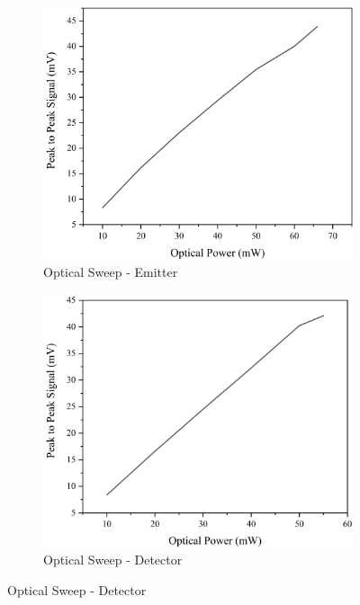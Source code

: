 \begin{figure}[ht]
\centering

\begin{subfigure}{0.49\textwidth}
\centering
\includegraphics[width=\textwidth]{Figures/Misc/SysDev/NBOpt150VG_V2.png}
\caption{Optical Sweep - Emitter}
\label{fig:NBOpt150V}
\end{subfigure}
\begin{subfigure}{0.49\textwidth}
\centering
\includegraphics[width=\textwidth]{Figures/Misc/SysDev/NBOptDet150V_V2.png}
\caption{Optical Sweep - Detector}
\label{fig:NBOptDet150V}
\end{subfigure}


\end{figure}
